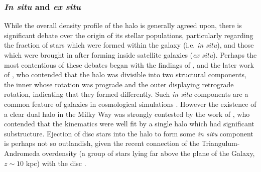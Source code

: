 \subsubsection{\emph{In situ} and \emph{ex situ}}
While the overall density profile of the halo is generally agreed upon, there is significant debate over the origin of its stellar populations, particularly regarding the fraction of stars which were formed within the galaxy (i.e. \emph{in situ}), and those which were brought in after forming inside satellite galaxies (\emph{ex situ}). Perhaps the most contentious of these debates began with the findings of \citet{2007Natur.450.1020C}, and the later work of \citet{2012ApJ...746...34B}, who contended that the halo was divisible into two structural components, the inner whose rotation was prograde and the outer displaying retrograde rotation, indicating that they formed differently. Such \emph{in situ} components are a common feature of galaxies in cosmological simulations \citep[e.g.][]{2011MNRAS.416.2802F,2012MNRAS.420.2245M}. However the existence of a clear dual halo in the Milky Way was strongly contested by the work of \citet{2014ApJ...786....7S}, who contended that the kinematics were well fit by a single halo which had significant substructure. Ejection of disc stars into the halo to form some \emph{in situ} component is perhaps not so outlandish, given the recent connection of the Triangulum-Andromeda overdensity (a group of stars lying far above the plane of the Galaxy, $z \sim 10$ kpc) with the disc \citep{2015MNRAS.452..676P,2018Natur.555..334B}.

